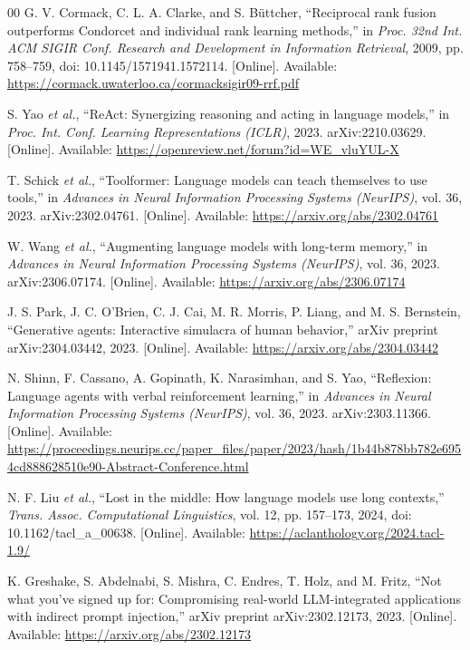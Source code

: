 \documentclass[conference,letterpaper]{IEEEtran}
\begin{document}
\begin{thebibliography}{00}
G. V. Cormack, C. L. A. Clarke, and S. B{\"u}ttcher, ``Reciprocal rank fusion outperforms Condorcet and individual rank learning methods,'' in \emph{Proc. 32nd Int. ACM SIGIR Conf. Research and Development in Information Retrieval}, 2009, pp. 758--759, doi: 10.1145/1571941.1572114. [Online]. Available: \url{https://cormack.uwaterloo.ca/cormacksigir09-rrf.pdf}

S. Yao \emph{et al.}, ``ReAct: Synergizing reasoning and acting in language models,'' in \emph{Proc. Int. Conf. Learning Representations (ICLR)}, 2023. arXiv:2210.03629. [Online]. Available: \url{https://openreview.net/forum?id=WE_vluYUL-X}

T. Schick \emph{et al.}, ``Toolformer: Language models can teach themselves to use tools,'' in \emph{Advances in Neural Information Processing Systems (NeurIPS)}, vol. 36, 2023. arXiv:2302.04761. [Online]. Available: \url{https://arxiv.org/abs/2302.04761}

W. Wang \emph{et al.}, ``Augmenting language models with long-term memory,'' in \emph{Advances in Neural Information Processing Systems (NeurIPS)}, vol. 36, 2023. arXiv:2306.07174. [Online]. Available: \url{https://arxiv.org/abs/2306.07174}

J. S. Park, J. C. O'Brien, C. J. Cai, M. R. Morris, P. Liang, and M. S. Bernstein, ``Generative agents: Interactive simulacra of human behavior,'' arXiv preprint arXiv:2304.03442, 2023. [Online]. Available: \url{https://arxiv.org/abs/2304.03442}

N. Shinn, F. Cassano, A. Gopinath, K. Narasimhan, and S. Yao, ``Reflexion: Language agents with verbal reinforcement learning,'' in \emph{Advances in Neural Information Processing Systems (NeurIPS)}, vol. 36, 2023. arXiv:2303.11366. [Online]. Available: \url{https://proceedings.neurips.cc/paper_files/paper/2023/hash/1b44b878bb782e6954cd888628510e90-Abstract-Conference.html}

N. F. Liu \emph{et al.}, ``Lost in the middle: How language models use long contexts,'' \emph{Trans. Assoc. Computational Linguistics}, vol. 12, pp. 157--173, 2024, doi: 10.1162/tacl\_a\_00638. [Online]. Available: \url{https://aclanthology.org/2024.tacl-1.9/}

K. Greshake, S. Abdelnabi, S. Mishra, C. Endres, T. Holz, and M. Fritz, ``Not what you've signed up for: Compromising real-world LLM-integrated applications with indirect prompt injection,'' arXiv preprint arXiv:2302.12173, 2023. [Online]. Available: \url{https://arxiv.org/abs/2302.12173}


\end{thebibliography}
\end{document}
